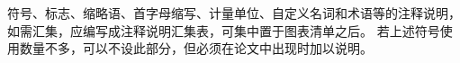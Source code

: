 \begin{symabbr}
    符号、标志、缩略语、首字母缩写、计量单位、自定义名词和术语等的注释说明，如需汇集，应编写成注释说明汇集表，可集中置于图表清单之后。
    若上述符号使用数量不多，可以不设此部分，但必须在论文中出现时加以说明。
\end{symabbr}
